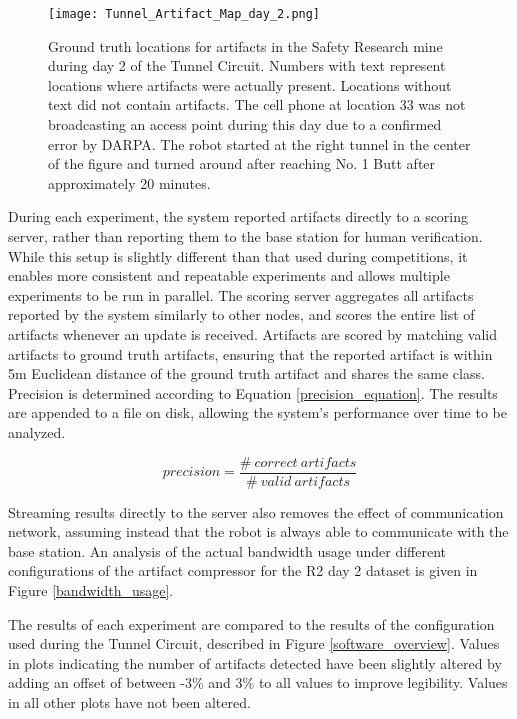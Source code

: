 \begin{figure}	
	\centering
	\texttt{[image: Tunnel\_Artifact\_Map\_day\_2.png]}
	\caption[Tunnel Circuit day 2 artifact locations]{Ground truth locations for artifacts in the Safety Research mine during day 2 of the Tunnel Circuit. Numbers with text represent locations where artifacts were actually present. Locations without text did not contain artifacts. The cell phone at location 33 was not broadcasting an access point during this day due to a confirmed error by DARPA. The robot started at the right tunnel in the center of the figure and turned around after reaching No. 1 Butt after approximately 20 minutes.}
	\label{tunnel_circuit_day_2}
\end{figure}

During each experiment, the system reported artifacts directly to a scoring server, rather than reporting them to the base station for human verification. While this setup is slightly different than that used during competitions, it enables more consistent and repeatable experiments and allows multiple experiments to be run in parallel. The scoring server aggregates all artifacts reported by the system similarly to other nodes, and scores the entire list of artifacts whenever an update is received. Artifacts are scored by matching valid artifacts to ground truth artifacts, ensuring that the reported artifact is within 5m Euclidean distance of the ground truth artifact and shares the same class. Precision is determined according to Equation \ref{precision_equation}. The results are appended to a file on disk, allowing the system's performance over time to be analyzed.

\begin{equation} \label{precision_equation}
precision = \frac{\#\ correct\ artifacts}{\#\ valid\ artifacts}
\end{equation}

Streaming results directly to the server also removes the effect of communication network, assuming instead that the robot is always able to communicate with the base station. An analysis of the actual bandwidth usage under different configurations of the artifact compressor for the R2 day 2 dataset is given in Figure \ref{bandwidth_usage}. 

The results of each experiment are compared to the results of the configuration used during the Tunnel Circuit, described in Figure \ref{software_overview}. Values in plots indicating the number of artifacts detected have been slightly altered by adding an offset of between -3\% and 3\% to all values to improve legibility. Values in all other plots have not been altered.

